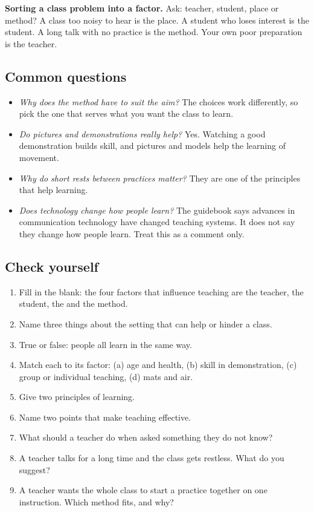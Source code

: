 \textbf{Sorting a class problem into a factor.} Ask: teacher, student, place or method? A class too noisy to hear is the place. A student who loses interest is the student. A long talk with no practice is the method. Your own poor preparation is the teacher.

\subsection*{Common questions}

\begin{itemize}
\item \emph{Why does the method have to suit the aim?} The choices work differently, so pick the one that serves what you want the class to learn.
\item \emph{Do pictures and demonstrations really help?} Yes. Watching a good demonstration builds skill, and pictures and models help the learning of movement.
\item \emph{Why do short rests between practices matter?} They are one of the principles that help learning.
\item \emph{Does technology change how people learn?} The guidebook says advances in communication technology have changed teaching systems. It does not say they change how people learn. Treat this as a comment only.
\end{itemize}

\subsection*{Check yourself}

\begin{enumerate}
\item Fill in the blank: the four factors that influence teaching are the teacher, the student, the \underline{\hspace{2cm}} and the method.
\item Name three things about the setting that can help or hinder a class.
\item True or false: people all learn in the same way.
\item Match each to its factor: (a) age and health, (b) skill in demonstration, (c) group or individual teaching, (d) mats and air.
\item Give two principles of learning.
\item Name two points that make teaching effective.
\item What should a teacher do when asked something they do not know?
\item A teacher talks for a long time and the class gets restless. What do you suggest?
\item A teacher wants the whole class to start a practice together on one instruction. Which method fits, and why?
\end{enumerate}

